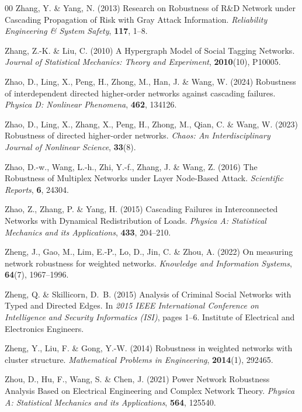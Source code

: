 \documentclass{comnet-mod}
\begin{document}
\begin{thebibliography}{00}
Zhang, Y. {\&} Yang, N. (2013)  {Research on Robustness of {{R}}\&{{D}} Network
  under Cascading Propagation of Risk with Gray Attack Information}. {\em
  {Reliability Engineering \& System Safety}}, \textbf{117}, 1--8.

Zhang, Z.-K. {\&} Liu, C. (2010)  {A Hypergraph Model of Social Tagging
  Networks}. {\em {Journal of Statistical Mechanics: Theory and Experiment}},
  \textbf{2010}(10), P10005.

Zhao, D., Ling, X., Peng, H., Zhong, M., Han, J. {\&} Wang, W. (2024)
  Robustness of interdependent directed higher-order networks against cascading
  failures. {\em {Physica D: Nonlinear Phenomena}}, \textbf{462}, 134126.

Zhao, D., Ling, X., Zhang, X., Peng, H., Zhong, M., Qian, C. {\&} Wang, W.
  (2023)  Robustness of directed higher-order networks. {\em {Chaos: An
  Interdisciplinary Journal of Nonlinear Science}}, \textbf{33}(8).

Zhao, D.-w., Wang, L.-h., Zhi, Y.-f., Zhang, J. {\&} Wang, Z. (2016)  {The
  Robustness of Multiplex Networks under Layer Node-Based Attack}. {\em
  {Scientific Reports}}, \textbf{6}, 24304.

Zhao, Z., Zhang, P. {\&} Yang, H. (2015)  {Cascading Failures in Interconnected
  Networks with Dynamical Redistribution of Loads}. {\em {Physica A:
  Statistical Mechanics and its Applications}}, \textbf{433}, 204--210.

Zheng, J., Gao, M., Lim, E.-P., Lo, D., Jin, C. {\&} Zhou, A. (2022)  On
  measuring network robustness for weighted networks. {\em {Knowledge and
  Information Systems}}, \textbf{64}(7), 1967--1996.

Zheng, Q. {\&} Skillicorn, D.~B. (2015)  {Analysis of Criminal Social Networks
  with Typed and Directed Edges}. In {\em {2015 {{IEEE}} International
  Conference on Intelligence and Security Informatics ({{ISI}})}}, pages 1--6.
  {Institute of Electrical and Electronics Engineers}.

Zheng, Y., Liu, F. {\&} Gong, Y.-W. (2014)  Robustness in weighted networks
  with cluster structure. {\em {Mathematical Problems in Engineering}},
  \textbf{2014}(1), 292465.

Zhou, D., Hu, F., Wang, S. {\&} Chen, J. (2021)  {Power Network Robustness
  Analysis Based on Electrical Engineering and Complex Network Theory}. {\em
  {Physica A: Statistical Mechanics and its Applications}}, \textbf{564},
  125540.


\end{thebibliography}
\end{document}
